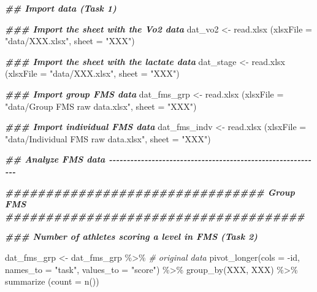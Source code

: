 \documentclass[
]{book}
\newenvironment{Shaded}{\begin{snugshade}}{\end{snugshade}}
\newcommand{\AttributeTok}[1]{\textcolor[rgb]{0.77,0.63,0.00}{#1}}
\newcommand{\CommentTok}[1]{\textcolor[rgb]{0.56,0.35,0.01}{\textit{#1}}}
\newcommand{\DocumentationTok}[1]{\textcolor[rgb]{0.56,0.35,0.01}{\textbf{\textit{#1}}}}
\newcommand{\FunctionTok}[1]{\textcolor[rgb]{0.00,0.00,0.00}{#1}}
\newcommand{\NormalTok}[1]{#1}
\newcommand{\OtherTok}[1]{\textcolor[rgb]{0.56,0.35,0.01}{#1}}
\newcommand{\SpecialCharTok}[1]{\textcolor[rgb]{0.00,0.00,0.00}{#1}}
\newcommand{\StringTok}[1]{\textcolor[rgb]{0.31,0.60,0.02}{#1}}
\begin{document}
\begin{Shaded}
\begin{Highlighting}[]
\DocumentationTok{\#\# Import data (Task 1)}

\DocumentationTok{\#\#\# Import the sheet with the Vo2 data}
\NormalTok{dat\_vo2 }\OtherTok{\textless{}{-}}  \FunctionTok{read.xlsx}\NormalTok{ (}\AttributeTok{xlsxFile =} \StringTok{"data/XXX.xlsx"}\NormalTok{,}
                       \AttributeTok{sheet =} \StringTok{"XXX"}\NormalTok{)}

\DocumentationTok{\#\#\# Import the sheet with the lactate data}
\NormalTok{dat\_stage }\OtherTok{\textless{}{-}}  \FunctionTok{read.xlsx}\NormalTok{ (}\AttributeTok{xlsxFile =} \StringTok{"data/XXX.xlsx"}\NormalTok{,}
                       \AttributeTok{sheet =} \StringTok{"XXX"}\NormalTok{)}

\DocumentationTok{\#\#\# Import group FMS data}
\NormalTok{dat\_fms\_grp }\OtherTok{\textless{}{-}}  \FunctionTok{read.xlsx}\NormalTok{ (}\AttributeTok{xlsxFile =} \StringTok{"data/Group FMS raw data.xlsx"}\NormalTok{,}
                       \AttributeTok{sheet =} \StringTok{"XXX"}\NormalTok{)}

\DocumentationTok{\#\#\# Import individual FMS data}
\NormalTok{dat\_fms\_indv }\OtherTok{\textless{}{-}}  \FunctionTok{read.xlsx}\NormalTok{ (}\AttributeTok{xlsxFile =} \StringTok{"data/Individual FMS raw data.xlsx"}\NormalTok{,}
                       \AttributeTok{sheet =} \StringTok{"XXX"}\NormalTok{)}

\DocumentationTok{\#\# Analyze FMS data {-}{-}{-}{-}{-}{-}{-}{-}{-}{-}{-}{-}{-}{-}{-}{-}{-}{-}{-}{-}{-}{-}{-}{-}{-}{-}{-}{-}{-}{-}{-}{-}{-}{-}{-}{-}{-}{-}{-}{-}{-}{-}{-}{-}{-}{-}{-}{-}{-}{-}{-}{-}{-}{-}{-}{-}{-}{-}{-}{-}}

\DocumentationTok{\#\#\#\#\#\#\#\#\#\#\#\#\#\#\#\#\#\#\#\#\#\#\#\#\#\#\#\#\#\#\#\# Group FMS \#\#\#\#\#\#\#\#\#\#\#\#\#\#\#\#\#\#\#\#\#\#\#\#\#\#\#\#\#\#\#\#\#\#\#\#\#}

\DocumentationTok{\#\#\# Number of athletes scoring a level in FMS (Task 2)}

\NormalTok{dat\_fms\_grp }\OtherTok{\textless{}{-}}\NormalTok{ dat\_fms\_grp }\SpecialCharTok{\%\textgreater{}\%} \CommentTok{\# original data}
  \FunctionTok{pivot\_longer}\NormalTok{(}\AttributeTok{cols =} \SpecialCharTok{{-}}\NormalTok{id,}
              \AttributeTok{names\_to =} \StringTok{"task"}\NormalTok{,}
              \AttributeTok{values\_to =} \StringTok{"score"}\NormalTok{) }\SpecialCharTok{\%\textgreater{}\%}
  \FunctionTok{group\_by}\NormalTok{(XXX, XXX) }\SpecialCharTok{\%\textgreater{}\%}
  \FunctionTok{summarize}\NormalTok{ (}\AttributeTok{count =} \FunctionTok{n}\NormalTok{()) }


\end{Highlighting}
\end{Shaded}
\end{document}
